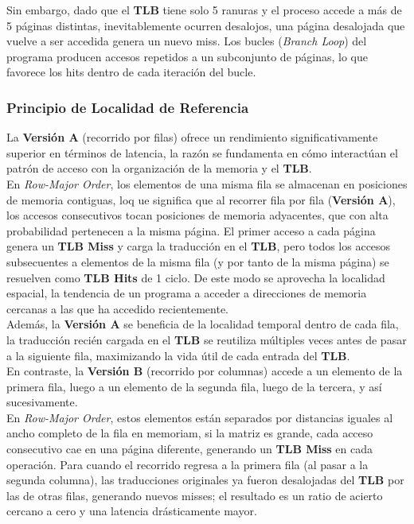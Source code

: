 \documentclass[12pt,letterpaper]{article}
\begin{document}
Sin embargo, dado que el \textbf{TLB} tiene solo 5 ranuras y el proceso accede a más de 5 páginas distintas,
inevitablemente ocurren desalojos, una página desalojada que vuelve a ser accedida genera un nuevo miss. Los
bucles (\textit{Branch Loop}) del programa producen accesos repetidos a un subconjunto de páginas, lo que
favorece los hits dentro de cada iteración del bucle.

\subsubsection*{Principio de Localidad de Referencia}
La \textbf{Versión A} (recorrido por filas) ofrece un rendimiento significativamente superior en términos de
latencia, la razón se fundamenta en cómo interactúan el patrón de acceso con la organización de la memoria y el
\textbf{TLB}.\\

En \textit{Row-Major Order}, los elementos de una misma fila se almacenan en posiciones de memoria contiguas,
loq ue significa que al recorrer fila por fila (\textbf{Versión A}), los accesos consecutivos tocan posiciones
de memoria adyacentes, que con alta probabilidad pertenecen a la misma página. El primer acceso a cada página
genera un \textbf{TLB Miss} y carga la traducción en el \textbf{TLB}, pero todos los accesos subsecuentes a
elementos de la misma fila (y por tanto de la misma página) se resuelven como \textbf{TLB Hits} de 1 ciclo.
De este modo se aprovecha la localidad espacial, la tendencia de un programa a acceder a direcciones de memoria
cercanas a las que ha accedido recientemente.\\

Además, la \textbf{Versión A} se beneficia de la localidad temporal dentro de cada fila, la traducción recién
cargada en el \textbf{TLB} se reutiliza múltiples veces antes de pasar a la siguiente fila, maximizando la vida
útil de cada entrada del \textbf{TLB}.\\

En contraste, la \textbf{Versión B} (recorrido por columnas) accede a un elemento de la primera fila, luego a un
elemento de la segunda fila, luego de la tercera, y así sucesivamente.\\

En \textit{Row-Major Order}, estos elementos están separados por distancias iguales al ancho completo de la fila
en memoriam, si la matriz es grande, cada acceso consecutivo cae en una página diferente, generando un
\textbf{TLB Miss} en cada operación. Para cuando el recorrido regresa a la primera fila (al pasar a la segunda
columna), las traducciones originales ya fueron desalojadas del \textbf{TLB} por las de otras filas, generando
nuevos misses; el resultado es un ratio de acierto cercano a cero y una latencia drásticamente mayor.\\
\end{document}
